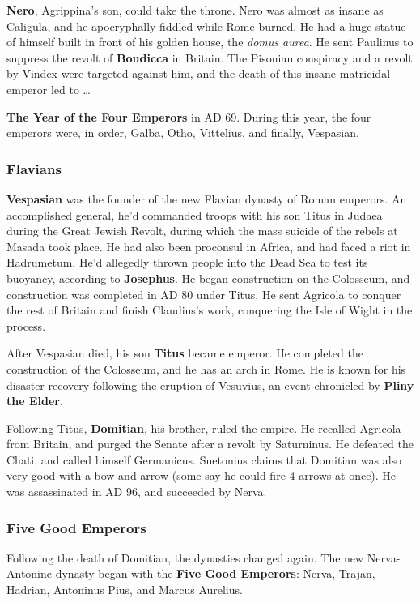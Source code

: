 \textbf{Nero}, Agrippina's son, could take the throne.
Nero was almost as insane as Caligula, and he apocryphally fiddled while Rome burned.
He had a huge statue of himself built in front of his golden house, the \textit{domus aurea}.
He sent Paulinus to suppress the revolt of \textbf{Boudicca} in Britain.
The Pisonian conspiracy and a revolt by Vindex were targeted against him,
and the death of this insane matricidal emperor led to \ldots

\textbf{The Year of the Four Emperors} in AD 69. During this year, the four emperors were, in order,
Galba, Otho, Vittelius, and finally, Vespasian.

\subsubsection*{Flavians}

\textbf{Vespasian} was the founder of the new Flavian dynasty of Roman emperors.
An accomplished general, he'd commanded troops with his son Titus in Judaea during the Great Jewish Revolt,
during which the mass suicide of the rebels at Masada took place.
He had also been proconsul in Africa, and had faced a riot in Hadrumetum.
He'd allegedly thrown people into the Dead Sea to test its buoyancy, according to \textbf{Josephus}.
He began construction on the Colosseum, and construction was completed in AD 80 under Titus.
He sent Agricola to conquer the rest of Britain and finish Claudius's work,
conquering the Isle of Wight in the process.

After Vespasian died, his son \textbf{Titus} became emperor.
He completed the construction of the Colosseum, and he has an arch in Rome.
He is known for his disaster recovery following the eruption of Vesuvius,
an event chronicled by \textbf{Pliny the Elder}.

Following Titus, \textbf{Domitian}, his brother, ruled the empire.
He recalled Agricola from Britain, and purged the Senate after a revolt by Saturninus.
He defeated the Chati, and called himself Germanicus.
Suetonius claims that Domitian was also very good with a bow and arrow
(some say he could fire 4 arrows at once).
He was assassinated in AD 96, and succeeded by Nerva.

\subsubsection*{Five Good Emperors}

Following the death of Domitian, the dynasties changed again.
The new Nerva-Antonine dynasty began with the \textbf{Five Good Emperors}:
Nerva, Trajan, Hadrian, Antoninus Pius, and Marcus Aurelius.

